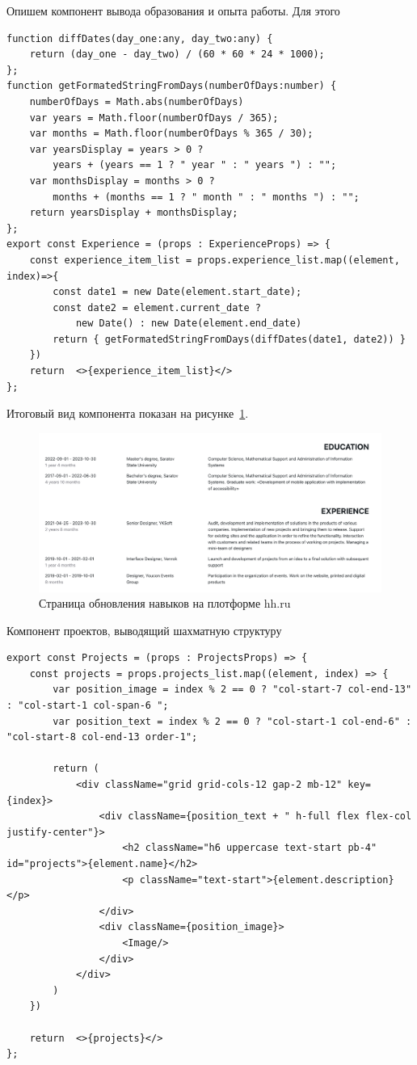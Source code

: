 \documentclass[master, och, pract]{SCWorks}
\begin{document}
Опишем компонент вывода образования и опыта работы. Для этого 
\begin{verbatim}
function diffDates(day_one:any, day_two:any) {
    return (day_one - day_two) / (60 * 60 * 24 * 1000);
};
function getFormatedStringFromDays(numberOfDays:number) {
    numberOfDays = Math.abs(numberOfDays)
    var years = Math.floor(numberOfDays / 365);
    var months = Math.floor(numberOfDays % 365 / 30);
    var yearsDisplay = years > 0 ? 
        years + (years == 1 ? " year " : " years ") : "";
    var monthsDisplay = months > 0 ? 
        months + (months == 1 ? " month " : " months ") : "";
    return yearsDisplay + monthsDisplay; 
};
export const Experience = (props : ExperienceProps) => {
    const experience_item_list = props.experience_list.map((element, index)=>{
        const date1 = new Date(element.start_date);
        const date2 = element.current_date ? 
            new Date() : new Date(element.end_date)
        return { getFormatedStringFromDays(diffDates(date1, date2)) } 
    })
    return  <>{experience_item_list}</>
};
\end{verbatim}

Итоговый вид компонента показан на рисунке~\ref{fig:3}.  
\begin{figure}[!ht]
    \centering
    \includegraphics[width=12cm]{images/image-resume-2.png}
    \caption{\label{fig:3}%
        Страница обновления навыков на плотформе hh.ru}
\end{figure}




Компонент проектов, выводящий шахматную структуру 
\begin{verbatim}
export const Projects = (props : ProjectsProps) => {
    const projects = props.projects_list.map((element, index) => {
        var position_image = index % 2 == 0 ? "col-start-7 col-end-13" : "col-start-1 col-span-6 ";
        var position_text = index % 2 == 0 ? "col-start-1 col-end-6" : "col-start-8 col-end-13 order-1";

        return (
            <div className="grid grid-cols-12 gap-2 mb-12" key={index}>
                <div className={position_text + " h-full flex flex-col justify-center"}>
                    <h2 className="h6 uppercase text-start pb-4" id="projects">{element.name}</h2>
                    <p className="text-start">{element.description}</p>
                </div>
                <div className={position_image}>
                    <Image/>
                </div>
            </div>
        )
    })

    return  <>{projects}</>
};
\end{verbatim}
\end{document}
